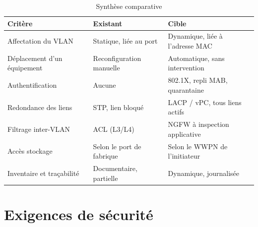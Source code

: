 \documentclass[11pt,a4paper]{article}
\begin{document}
\begin{table}[H]
\centering
\caption{Synthèse comparative}
\begin{tabularx}{\textwidth}{L{3.5cm} Y Y}
\toprule
{}\textbf{Critère} & \textbf{Existant} & \textbf{Cible} \\
\midrule
Affectation du VLAN & Statique, liée au port & Dynamique, liée à l'adresse MAC \\
Déplacement d'un équipement & Reconfiguration manuelle & Automatique, sans intervention \\
Authentification & Aucune & 802.1X, repli MAB, quarantaine \\
Redondance des liens & STP, lien bloqué & LACP / vPC, tous liens actifs \\
Filtrage inter-VLAN & ACL (L3/L4) & NGFW à inspection applicative \\
Accès stockage & Selon le port de fabrique & Selon le WWPN de l'initiateur \\
Inventaire et traçabilité & Documentaire, partielle & Dynamique, journalisée \\
\bottomrule
\end{tabularx}
\end{table}

\section{Exigences de sécurité}
\end{document}
